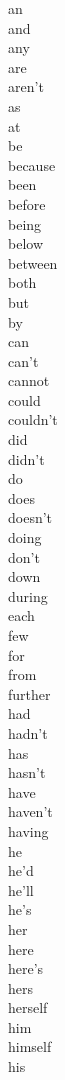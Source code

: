\begin{appendices}
\begin{multicols}{7}
an\\
and\\
any\\
are\\
aren't\\
as\\
at\\
be\\
because\\
been\\
before\\
being\\
below\\
between\\
both\\
but\\
by\\
can\\
can't\\
cannot\\
could\\
couldn't\\
did\\
didn't\\
do\\
does\\
doesn't\\
doing\\
don't\\
down\\
during\\
each\\
few\\
for\\
from\\
further\\
had\\
hadn't\\
has\\
hasn't\\
have\\
haven't\\
having\\
he\\
he'd\\
he'll\\
he's\\
her\\
here\\
here's\\
hers\\
herself\\
him\\
himself\\
his\\

\end{multicols}
\end{appendices}
